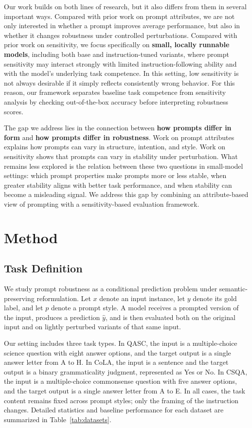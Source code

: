 \documentclass[11pt]{article}
\begin{document}
Our work builds on both lines of research, but it also differs from them in several important ways. Compared with prior work on prompt attributes, we are not only interested in whether a prompt improves average performance, but also in whether it changes robustness under controlled perturbations. Compared with prior work on sensitivity, we focus specifically on \textbf{small, locally runnable models}, including both base and instruction-tuned variants, where prompt sensitivity may interact strongly with limited instruction-following ability and with the model's underlying task competence. In this setting, low sensitivity is not always desirable if it simply reflects consistently wrong behavior. For this reason, our framework separates baseline task competence from sensitivity analysis by checking out-of-the-box accuracy before interpreting robustness scores.

The gap we address lies in the connection between \textbf{how prompts differ in form} and \textbf{how prompts differ in robustness}. Work on prompt attributes explains how prompts can vary in structure, intention, and style. Work on sensitivity shows that prompts can vary in stability under perturbation. What remains less explored is the relation between these two questions in small-model settings: which prompt properties make prompts more or less stable, when greater stability aligns with better task performance, and when stability can become a misleading signal. We address this gap by combining an attribute-based view of prompting with a sensitivity-based evaluation framework.

\section{Method}

\subsection{Task Definition}

We study prompt robustness as a conditional prediction problem under semantic-preserving reformulation. Let $x$ denote an input instance, let $y$ denote its gold label, and let $p$ denote a prompt style. A model receives a prompted version of the input, produces a prediction $\hat{y}$, and is then evaluated both on the original input and on lightly perturbed variants of that same input.

Our setting includes three task types. In QASC, the input is a multiple-choice science question with eight answer options, and the target output is a single answer letter from A to H. In CoLA, the input is a sentence and the target output is a binary grammaticality judgment, represented as Yes or No. In CSQA, the input is a multiple-choice commonsense question with five answer options, and the target output is a single answer letter from A to E. In all cases, the task content remains fixed across prompt styles; only the framing of the instruction changes. Detailed statistics and baseline performance for each dataset are summarized in Table~\ref{tab:datasets}.
\end{document}
